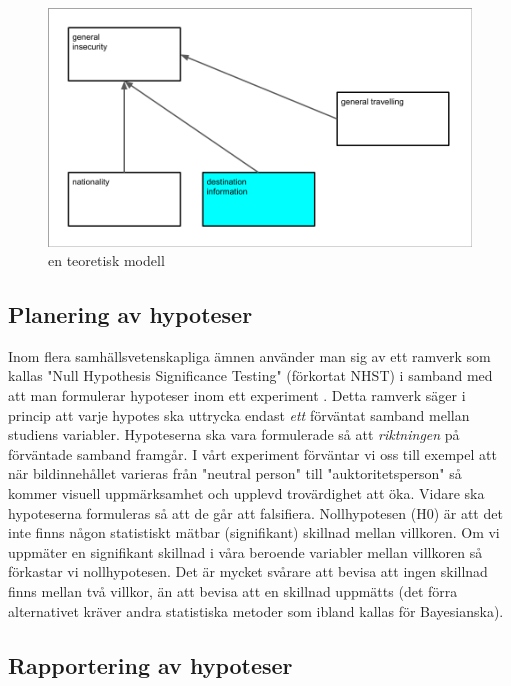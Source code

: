 \documentclass[
]{book}
\begin{document}
\begin{figure}

{\centering \includegraphics[width=0.8\linewidth]{../fig/model} 

}

\caption{en teoretisk modell}\label{fig:img-model}
\end{figure}

\hypertarget{sub06.3.1}{%
\subsection{Planering av hypoteser}\label{sub06.3.1}}

Inom flera samhällsvetenskapliga ämnen använder man sig av ett ramverk som kallas "Null Hypothesis Significance Testing" (förkortat NHST) i samband med att man formulerar hypoteser inom ett experiment \citep{pernet2015null}. Detta ramverk säger i princip att varje hypotes ska uttrycka endast \emph{ett} förväntat samband mellan studiens variabler. Hypoteserna ska vara formulerade så att \emph{riktningen} på förväntade samband framgår. I vårt experiment förväntar vi oss till exempel att när bildinnehållet varieras från "neutral person" till "auktoritetsperson" så kommer visuell uppmärksamhet och upplevd trovärdighet att öka. Vidare ska hypoteserna formuleras så att de går att falsifiera. Nollhypotesen (H0) är att det inte finns någon statistiskt mätbar (signifikant) skillnad mellan villkoren. Om vi uppmäter en signifikant skillnad i våra beroende variabler mellan villkoren så förkastar vi nollhypotesen. Det är mycket svårare att bevisa att ingen skillnad finns mellan två villkor, än att bevisa att en skillnad uppmätts (det förra alternativet kräver andra statistiska metoder som ibland kallas för Bayesianska).

\hypertarget{sub06.3.2}{%
\subsection{Rapportering av hypoteser}\label{sub06.3.2}}
\end{document}
